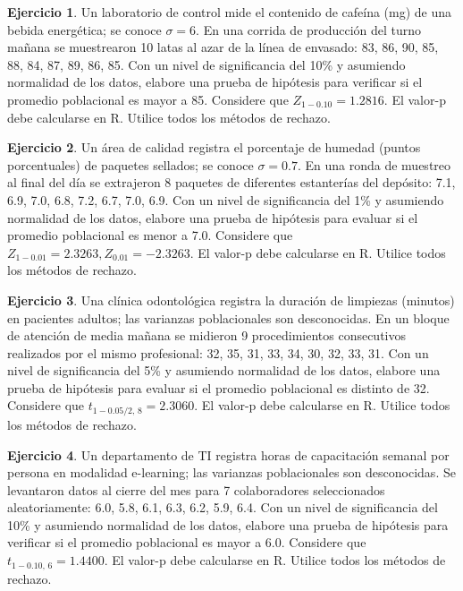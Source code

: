 \documentclass[
  11pt,
]{book}
\theoremstyle{definition}
\theoremstyle{definition}
\theoremstyle{definition}
\newtheorem{exercise}{Ejercicio}[chapter]
\theoremstyle{definition}
\theoremstyle{remark}
\begin{document}
\begin{exercise}
Un laboratorio de control mide el contenido de cafeína (mg) de una bebida energética; se conoce \(\sigma=6\). En una corrida de producción del turno mañana se muestrearon 10 latas al azar de la línea de envasado: 83, 86, 90, 85, 88, 84, 87, 89, 86, 85. Con un nivel de significancia del 10\% y asumiendo normalidad de los datos, elabore una prueba de hipótesis para verificar si el promedio poblacional es mayor a 85. Considere que \(Z_{1-0.10}=1.2816\). El valor-p debe calcularse en R. Utilice todos los métodos de rechazo.
\end{exercise}

\begin{exercise}
Un área de calidad registra el porcentaje de humedad (puntos porcentuales) de paquetes sellados; se conoce \(\sigma=0.7\). En una ronda de muestreo al final del día se extrajeron 8 paquetes de diferentes estanterías del depósito: 7.1, 6.9, 7.0, 6.8, 7.2, 6.7, 7.0, 6.9. Con un nivel de significancia del 1\% y asumiendo normalidad de los datos, elabore una prueba de hipótesis para evaluar si el promedio poblacional es menor a 7.0. Considere que \(Z_{1-0.01}=2.3263, Z_{0.01}=-2.3263\). El valor-p debe calcularse en R. Utilice todos los métodos de rechazo.
\end{exercise}

\begin{exercise}
Una clínica odontológica registra la duración de limpiezas (minutos) en pacientes adultos; las varianzas poblacionales son desconocidas. En un bloque de atención de media mañana se midieron 9 procedimientos consecutivos realizados por el mismo profesional: 32, 35, 31, 33, 34, 30, 32, 33, 31. Con un nivel de significancia del 5\% y asumiendo normalidad de los datos, elabore una prueba de hipótesis para evaluar si el promedio poblacional es distinto de 32. Considere que \(t_{1-0.05/2,\,8}=2.3060\). El valor-p debe calcularse en R. Utilice todos los métodos de rechazo.
\end{exercise}

\begin{exercise}
Un departamento de TI registra horas de capacitación semanal por persona en modalidad e-learning; las varianzas poblacionales son desconocidas. Se levantaron datos al cierre del mes para 7 colaboradores seleccionados aleatoriamente: 6.0, 5.8, 6.1, 6.3, 6.2, 5.9, 6.4. Con un nivel de significancia del 10\% y asumiendo normalidad de los datos, elabore una prueba de hipótesis para verificar si el promedio poblacional es mayor a 6.0. Considere que \(t_{1-0.10,\,6}=1.4400\). El valor-p debe calcularse en R. Utilice todos los métodos de rechazo.
\end{exercise}
\end{document}
